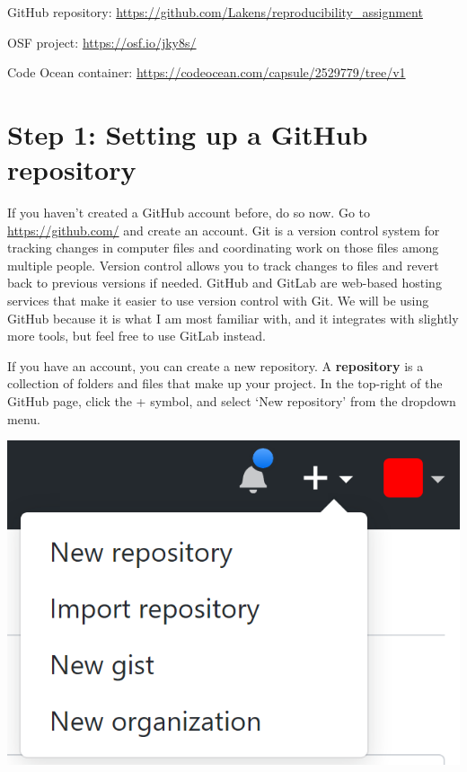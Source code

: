 \documentclass[
  oneside]{book}
\begin{document}
GitHub repository: \url{https://github.com/Lakens/reproducibility_assignment}

OSF project: \url{https://osf.io/jky8s/}

Code Ocean container: \url{https://codeocean.com/capsule/2529779/tree/v1}

\hypertarget{step-1-setting-up-a-github-repository}{%
\section{Step 1: Setting up a GitHub repository}\label{step-1-setting-up-a-github-repository}}

If you haven't created a GitHub account before, do so now. Go to
\url{https://github.com/} and create an account. Git is a version control system for
tracking changes in computer files and coordinating work on those files among
multiple people. Version control allows you to track changes to files and revert
back to previous versions if needed. GitHub and GitLab are web-based hosting
services that make it easier to use version control with Git. We will be using
GitHub because it is what I am most familiar with, and it integrates with
slightly more tools, but feel free to use GitLab instead.

If you have an account, you can create a new repository. A \textbf{repository} is a
collection of folders and files that make up your project. In the top-right of
the GitHub page, click the + symbol, and select `New repository' from the
dropdown menu.

\begin{center}\includegraphics[width=1\linewidth]{images/7a1725550cadb293b13fe058631a24ba} \end{center}
\end{document}
